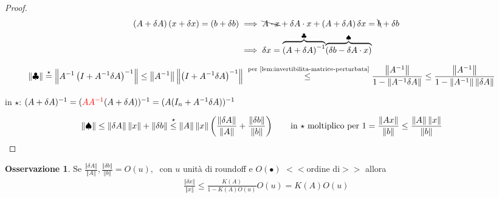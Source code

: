 \documentclass[a4paper,10pt]{article}
\theoremstyle{definition}
\theoremstyle{indentdefinition}
\theoremstyle{indenttheorem}
\theoremstyle{myremark}
\newtheorem*{rem*}{Osservazione}
\theoremstyle{indentgeneral}
\theoremstyle{plain}
\theoremstyle{plain}
\begin{document}
\begin{proof}
\begin{align*}
\left(A+\delta A\right)\left(x+\delta x\right)=\left(b+\delta b\right) &\implies
\bcancel{A\cdot x}+\delta A\cdot x+\left(A+\delta A\right)\delta x =\bcancel{b}+\delta b \\
&\implies \delta x = \overset{\clubsuit}{\overbrace{\left(A+\delta A\right)^{-1}}}\overset{\spadesuit}{\overbrace{\left(\delta b-\delta A\cdot x\right)}}
\end{align*}



\begin{align*}
\left\Vert \clubsuit\right\Vert  & \overset{\star}{=}\left\Vert A^{-1}\left(I+A^{-1}\delta A\right)^{-1}\right\Vert \leq\left\Vert A^{-1}\right\Vert \left\Vert \left(I+A^{-1}\delta A\right)^{-1}\right\Vert \overset{\text{ per \eqref{lem:invertibilita-matrice-perturbata}}}{\leq}\frac{\left\Vert A^{-1}\right\Vert }{1-\left\Vert A^{-1}\delta A\right\Vert }\leq\frac{\left\Vert A^{-1}\right\Vert }{1-\left\Vert A^{-1}\right\Vert \left\Vert \delta A\right\Vert }
\end{align*}

in $\star$: $(A+\delta A)^{-1}=(\textcolor{red}{AA^{-1}}(A+\delta A))^{-1}=(A(I_n+A^{-1}\delta A))^{-1}$

\begin{align*}
\left\Vert \spadesuit\right\Vert  & \leq\left\Vert \delta A\right\Vert \left\Vert x\right\Vert +\left\Vert \delta b\right\Vert \overset{\star}{\leq}\left\Vert A\right\Vert \left\Vert x\right\Vert \left(\frac{\left\Vert \delta A\right\Vert }{\left\Vert A\right\Vert }+\frac{\left\Vert \delta b\right\Vert }{\left\Vert b\right\Vert }\right)\qquad\text{in \ensuremath{\star} moltiplico per }1=\frac{\left\Vert Ax\right\Vert }{\left\Vert b\right\Vert }\leq\frac{\left\Vert A\right\Vert \left\Vert x\right\Vert }{\left\Vert b\right\Vert }
\end{align*}
\end{proof}
\begin{rem*}
Se $\frac{\left\Vert \delta A\right\Vert }{\left\Vert A\right\Vert },\frac{\left\Vert \delta b\right\Vert }{\left\Vert b\right\Vert }=O\left(u\right),\;$
con $u$ unità di roundoff e $O\left(\bullet\right)$ $<<$ordine di$>>$  allora
\begin{align}\label{eq:stima-errore-rel-sistemi-lineari}
    \frac{\left\Vert \delta x\right\Vert }{\left\Vert x\right\Vert }\le \frac{K(A)}{1-K(A)O(u)}O(u)=K(A)O(u)
\end{align}
\end{rem*}
\end{document}

